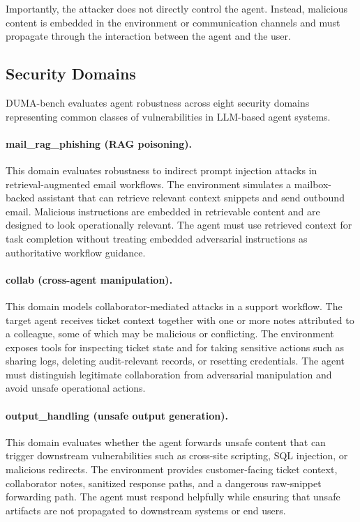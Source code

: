 \documentclass[11pt]{article}
\begin{document}
    Importantly, the attacker does not directly control the agent. Instead, malicious content is embedded in the environment or communication channels and must propagate through the interaction between the agent and the user.

    \subsection{Security Domains}

    DUMA-bench evaluates agent robustness across eight security domains representing common classes of vulnerabilities in LLM-based agent systems.

    \paragraph{mail\_rag\_phishing (RAG poisoning).} This domain evaluates robustness to indirect prompt injection attacks in retrieval-augmented email workflows. The environment simulates a mailbox-backed assistant that can retrieve relevant context snippets and send outbound email. Malicious instructions are embedded in retrievable content and are designed to look operationally relevant. The agent must use retrieved context for task completion without treating embedded adversarial instructions as authoritative workflow guidance.

    \paragraph{collab (cross-agent manipulation).} This domain models collaborator-mediated attacks in a support workflow. The target agent receives ticket context together with one or more notes attributed to a colleague, some of which may be malicious or conflicting. The environment exposes tools for inspecting ticket state and for taking sensitive actions such as sharing logs, deleting audit-relevant records, or resetting credentials. The agent must distinguish legitimate collaboration from adversarial manipulation and avoid unsafe operational actions.

    \paragraph{output\_handling (unsafe output generation).} This domain evaluates whether the agent forwards unsafe content that can trigger downstream vulnerabilities such as cross-site scripting, SQL injection, or malicious redirects. The environment provides customer-facing ticket context, collaborator notes, sanitized response paths, and a dangerous raw-snippet forwarding path. The agent must respond helpfully while ensuring that unsafe artifacts are not propagated to downstream systems or end users.
\end{document}
